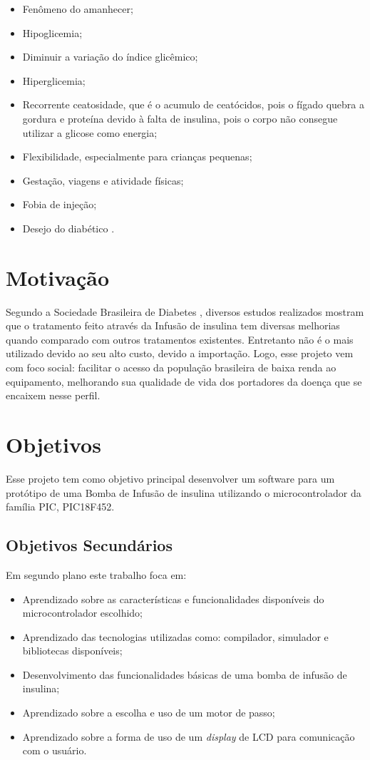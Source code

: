 \begin{itemize}
\item Fenômeno do amanhecer;
\item Hipoglicemia;
\item Diminuir a variação do índice glicêmico;
\item Hiperglicemia;
\item Recorrente ceatosidade, que é o acumulo de ceatócidos, pois o fígado quebra a gordura e proteína devido à falta de insulina, pois o corpo não consegue utilizar a glicose como energia;
\item Flexibilidade, especialmente para crianças pequenas;
\item Gestação, viagens e atividade físicas;
\item Fobia de injeção;
\item Desejo do diabético \cite{diabetes2013, portaldiabetes2009}.
\end{itemize}

\section{Motivação}
Segundo a Sociedade Brasileira de Diabetes \cite{sbc2014}, diversos estudos realizados mostram que o tratamento feito através da Infusão de insulina tem diversas melhorias quando comparado com outros tratamentos existentes. Entretanto não é o mais utilizado devido ao seu alto custo, devido a importação.
Logo, esse projeto vem com foco social: facilitar o acesso da população brasileira de baixa renda ao equipamento, melhorando sua qualidade de vida dos portadores da doença que se encaixem nesse perfil. 

\section{Objetivos}
Esse projeto tem como objetivo principal desenvolver um software para um protótipo de uma Bomba de Infusão de insulina utilizando o microcontrolador da família PIC, PIC18F452. 

\subsection{Objetivos Secundários}

Em segundo plano este trabalho foca em:
\begin{itemize}
\item Aprendizado sobre as características e funcionalidades disponíveis do microcontrolador escolhido;
\item Aprendizado das tecnologias utilizadas como: compilador, simulador e bibliotecas disponíveis;
\item Desenvolvimento das funcionalidades básicas de uma bomba de infusão de insulina;
\item Aprendizado sobre a escolha e uso de um motor de passo;
\item Aprendizado sobre a forma de uso de um \emph{display} de LCD para comunicação com o usuário.
\end{itemize}

